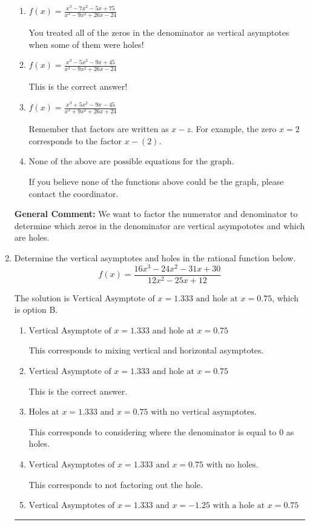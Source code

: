 \documentclass{extbook}[14pt]
\newcommand{\litem}[1]{\item #1

\rule{\textwidth}{0.4pt}}
\begin{document}
\begin{enumerate}
{\begin{enumerate}[label=\Alph*.]
You treated all of the zeros in the denominator as vertical asmptotes when some of them were holes and wrote factors as $x+z$.
\item \( f(x)=\frac{x^{3} -7 x^{2} -5 x + 75}{x^{3} -9 x^{2} +26 x -24} \)

You treated all of the zeros in the denominator as vertical asymptotes when some of them were holes!
\item \( f(x)=\frac{x^{3} -5 x^{2} -9 x + 45}{x^{3} -9 x^{2} +26 x -24} \)

This is the correct answer!
\item \( f(x)=\frac{x^{3} +5 x^{2} -9 x -45}{x^{3} +9 x^{2} +26 x + 24} \)

Remember that factors are written as $x-z$. For example, the zero $x=2$ corresponds to the factor $x-(2)$.
\item \( \text{None of the above are possible equations for the graph.} \)

If you believe none of the functions above could be the graph, please contact the coordinator.
\end{enumerate}

\textbf{General Comment:} We want to factor the numerator and denominator to determine which zeros in the denominator are vertical asympototes and which are holes.
}
\litem{
Determine the vertical asymptotes and holes in the rational function below.
\[ f(x) = \frac{16x^{3} -24 x^{2} -31 x + 30}{12x^{2} -25 x + 12} \]

The solution is \( \text{Vertical Asymptote of } x = 1.333 \text{ and hole at } x = 0.75 \), which is option B.\begin{enumerate}[label=\Alph*.]
\item \( \text{Vertical Asymptote of } x = 1.333 \text{ and hole at } x = 0.75 \)

This corresponds to mixing vertical and horizontal asymptotes.
\item \( \text{Vertical Asymptote of } x = 1.333 \text{ and hole at } x = 0.75 \)

This is the correct answer.
\item \( \text{Holes at } x = 1.333 \text{ and } x = 0.75 \text{ with no vertical asymptotes.} \)

This corresponds to considering where the denominator is equal to 0 as holes.
\item \( \text{Vertical Asymptotes of } x = 1.333 \text{ and } x = 0.75 \text{ with no holes.} \)

This corresponds to not factoring out the hole.
\item \( \text{Vertical Asymptotes of } x = 1.333 \text{ and } x = -1.25 \text{ with a hole at } x = 0.75 \)


\end{enumerate}}
\end{enumerate}
\end{document}
